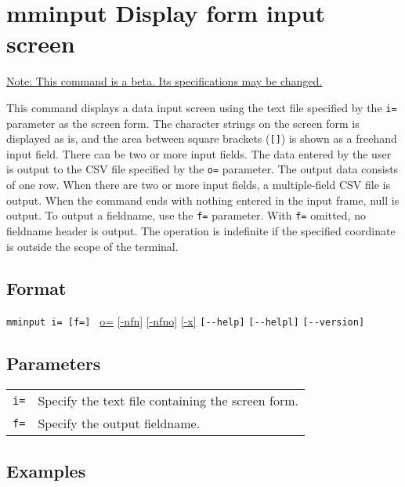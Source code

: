 
%

\section{mminput Display form input screen\label{sect:mminput}}
\underline{Note: This command is a beta. Its specifications may be changed.}

This command displays a data input screen using the text file specified by the \verb|i=| parameter as the screen form. The character strings on the screen form is displayed as is, and the area between square brackets (\verb|[]|) is shown as a freehand input field. There can be two or more input fields. The data entered by the user is output to the CSV file specified by the \verb|o=| parameter. The output data consists of one row. When there are two or more input fields, a multiple-field CSV file is output.
When the command ends with nothing entered in the input frame, null is output. To output a fieldname, use the \verb|f=| parameter. With \verb|f=| omitted, no fieldname header is output. 
The operation is indefinite if the specified coordinate is outside the scope of the terminal.

\subsection*{Format}
\verb/mminput i= [f=] /
\hyperref[sect:option_o]{o=}
\hyperref[sect:option_nfn]{[-nfn]} 
\hyperref[sect:option_nfno]{[-nfno]}  
\hyperref[sect:option_x]{[-x]}
\verb|[--help]|
\verb|[--helpl]|
\verb|[--version]|\\

\subsection*{Parameters}
\begin{table}[htbp]
{\small
\begin{tabular}{ll}
\verb|i=| & Specify the text file containing the screen form.\\
\verb|f=| & Specify the output fieldname.\\
\end{tabular} 
}
\end{table} 

\subsection*{Examples}

